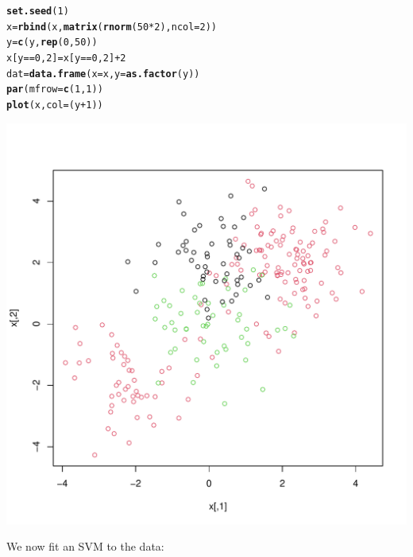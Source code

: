 \documentclass[12pt]{article}\usepackage[]{graphicx}\usepackage[]{color}
\makeatletter
\def\maxwidth{ %
  \ifdim\Gin@nat@width>\linewidth
    \linewidth
  \else
    \Gin@nat@width
  \fi
}
\newcommand{\hlnum}[1]{\textcolor[rgb]{0.686,0.059,0.569}{#1}}%
\newcommand{\hlopt}[1]{\textcolor[rgb]{0,0,0}{#1}}%
\newcommand{\hlstd}[1]{\textcolor[rgb]{0.345,0.345,0.345}{#1}}%
\newcommand{\hlkwb}[1]{\textcolor[rgb]{0.69,0.353,0.396}{#1}}%
\newcommand{\hlkwc}[1]{\textcolor[rgb]{0.333,0.667,0.333}{#1}}%
\newcommand{\hlkwd}[1]{\textcolor[rgb]{0.737,0.353,0.396}{\textbf{#1}}}%
\newenvironment{kframe}{%
 \def\at@end@of@kframe{}%
 \ifinner\ifhmode%
  \def\at@end@of@kframe{\end{minipage}}%
  \begin{minipage}{\columnwidth}%
 \fi\fi%
 \def\FrameCommand##1{\hskip\@totalleftmargin \hskip-\fboxsep
 \colorbox{shadecolor}{##1}\hskip-\fboxsep
     \hskip-\linewidth \hskip-\@totalleftmargin \hskip\columnwidth}%
 \MakeFramed {\advance\hsize-\width
   \@totalleftmargin\z@ \linewidth\hsize
   \@setminipage}}%
 {\par\unskip\endMakeFramed%
 \at@end@of@kframe}
\newenvironment{knitrout}{}{} %
\makeatother
\begin{document}
\begin{knitrout}
\color{fgcolor}\begin{kframe}
\begin{alltt}
\hlkwd{set.seed}\hlstd{(}\hlnum{1}\hlstd{)}
\hlstd{x}\hlkwb{=}\hlkwd{rbind}\hlstd{(x,}\hlkwd{matrix}\hlstd{(}\hlkwd{rnorm}\hlstd{(}\hlnum{50}\hlopt{*}\hlnum{2}\hlstd{),} \hlkwc{ncol}\hlstd{=}\hlnum{2}\hlstd{))}
\hlstd{y}\hlkwb{=}\hlkwd{c}\hlstd{(y,}\hlkwd{rep}\hlstd{(}\hlnum{0}\hlstd{,}\hlnum{50}\hlstd{))}
\hlstd{x[y}\hlopt{==}\hlnum{0}\hlstd{,}\hlnum{2}\hlstd{]}\hlkwb{=}\hlstd{x[y}\hlopt{==}\hlnum{0}\hlstd{,}\hlnum{2}\hlstd{]}\hlopt{+}\hlnum{2}
\hlstd{dat}\hlkwb{=}\hlkwd{data.frame}\hlstd{(}\hlkwc{x}\hlstd{=x,} \hlkwc{y}\hlstd{=}\hlkwd{as.factor}\hlstd{(y))}
\hlkwd{par}\hlstd{(}\hlkwc{mfrow}\hlstd{=}\hlkwd{c}\hlstd{(}\hlnum{1}\hlstd{,}\hlnum{1}\hlstd{))}
\hlkwd{plot}\hlstd{(x,}\hlkwc{col}\hlstd{=(y}\hlopt{+}\hlnum{1}\hlstd{))}
\end{alltt}
\end{kframe}
\includegraphics[width=\maxwidth]{figure/unnamed-chunk-27-1} 

\end{knitrout}

We now fit an SVM to the data:
\end{document}
